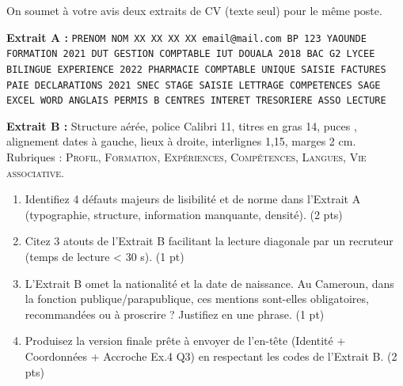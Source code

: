 \documentclass[11pt]{article}
\begin{document}
\begin{exercice}
On soumet à votre avis deux extraits de CV (texte seul) pour le même poste.

\textbf{Extrait A :} \texttt{PRENOM NOM  XX XX XX XX \quad email@mail.com \quad BP 123 YAOUNDE \quad FORMATION 2021 DUT GESTION COMPTABLE IUT DOUALA 2018 BAC G2 LYCEE BILINGUE \quad EXPERIENCE 2022 PHARMACIE COMPTABLE UNIQUE SAISIE FACTURES PAIE DECLARATIONS 2021 SNEC STAGE SAISIE LETTRAGE \quad COMPETENCES SAGE EXCEL WORD ANGLAIS PERMIS B \quad CENTRES INTERET TRESORIERE ASSO LECTURE}

\textbf{Extrait B :} Structure aérée, police Calibri 11, titres en gras 14, puces \textbullet, alignement dates à gauche, lieux à droite, interlignes 1,15, marges 2 cm. Rubriques : \textsc{Profil}, \textsc{Formation}, \textsc{Expériences}, \textsc{Compétences}, \textsc{Langues}, \textsc{Vie associative}.

\begin{enumerate}
    \item Identifiez 4 défauts majeurs de lisibilité et de norme dans l'Extrait A (typographie, structure, information manquante, densité). \hfill (2 pts)
    \item Citez 3 atouts de l'Extrait B facilitant la lecture diagonale par un recruteur (temps de lecture < 30 s). \hfill (1 pt)
    \item L'Extrait B omet la nationalité et la date de naissance. Au Cameroun, dans la fonction publique/parapublique, ces mentions sont-elles obligatoires, recommandées ou à proscrire ? Justifiez en une phrase. \hfill (1 pt)
    \item Produisez la version finale \og prête à envoyer \fg de l'en-tête (Identité + Coordonnées + Accroche Ex.4 Q3) en respectant les codes de l'Extrait B. \hfill (2 pts)
\end{enumerate}
\end{exercice}
\end{document}
